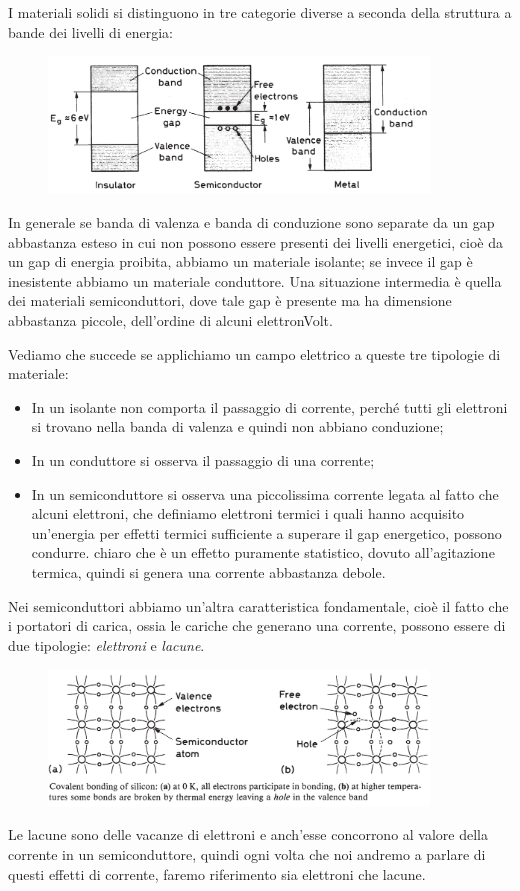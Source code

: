 I materiali solidi si distinguono in tre categorie diverse a seconda della struttura a bande dei livelli di energia:
\begin{figure}[H]
   \centering
   \includegraphics[width=0.9\textwidth]{immagini/bande_valenza_e_conduzione.png}
\end{figure}
In generale se banda di valenza e banda di conduzione sono separate da un gap abbastanza esteso in cui non possono essere presenti dei livelli energetici, cioè da un gap di energia proibita, abbiamo un materiale isolante; se invece il gap è inesistente abbiamo un materiale conduttore. Una situazione intermedia è quella dei materiali semiconduttori, dove tale gap è presente ma ha dimensione abbastanza piccole, dell'ordine di alcuni elettronVolt.

Vediamo che succede se applichiamo un campo elettrico a queste tre tipologie di materiale:
\begin{itemize}[leftmargin=0.5cm]
   \item In un isolante non comporta il passaggio di corrente, perché tutti gli elettroni si trovano nella banda di valenza e quindi non abbiano conduzione;
   \item In un conduttore si osserva il passaggio di una corrente;
   \item In un semiconduttore si osserva una piccolissima corrente legata al fatto che alcuni elettroni, che definiamo elettroni termici i quali hanno acquisito un'energia per effetti termici sufficiente a superare il gap energetico, possono condurre. \E chiaro che è un effetto puramente statistico, dovuto all'agitazione termica, quindi si genera una corrente abbastanza debole.
\end{itemize}
Nei semiconduttori abbiamo un'altra caratteristica fondamentale, cioè il fatto che i portatori di carica, ossia le cariche che generano una corrente, possono essere di due tipologie: \textit{elettroni} e \textit{lacune}.
\begin{figure}[H]
   \centering
   \includegraphics[width=0.9\textwidth]{immagini/elettroni_e_lacune_semiconduttori.png}
\end{figure}
Le lacune sono delle vacanze di elettroni e anch'esse concorrono al valore della corrente in un semiconduttore, quindi ogni volta che noi andremo a parlare di questi effetti di corrente, faremo riferimento sia elettroni che lacune.

